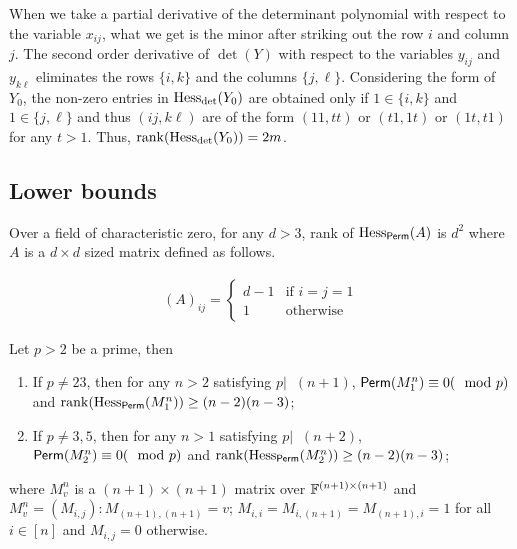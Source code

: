  When we take a  partial derivative of the determinant polynomial with respect to the variable $x_{ij}$, what we get is the minor after striking out the row $i$ and column $j$. 
 The second order derivative of $\det(Y)$ with respect to the variables $y_{ij}$ and $y_{k\ell}$ eliminates the rows $\{i,k\}$ and the columns $\{j,\ell\}$. Considering the form of $Y_0$, the non-zero entries in $\mathrm{Hess}_{\det}(Y_0)$ are obtained only if $1\in\{i,k\}$ and $1\in\{j,\ell\}$ and thus $(ij,k\ell)$ are of the form $(11,tt)$ or $(t1,1t)$ or $(1t,t1)$ for any $t>1$. Thus, $\mathrm{rank}(\mathrm{Hess}_{\det}(Y_0)) = 2m$.
 
\subsection{Lower bounds}

\begin{theorem}[\cite{mr04}]
	Over a field of characteristic zero, for any $d>3$, rank of $\mathrm{Hess}_{\mathsf{Perm}}(A)$ is $d^2$ where $A$ is a $d\times d$ sized matrix defined as follows.
	
	\begin{align*}
		(A)_{ij} = \begin{cases}
			d-1& \mbox{if $i=j=1$}\\
			1& \mbox{otherwise}
		\end{cases}
	\end{align*}
\end{theorem}

\begin{theorem}
	Let $p > 2$ be a prime, then
	\begin{enumerate}
		\item If $p \neq 23$, then for any $n > 2$ satisfying $p\lvert 􏰄􏰄(n+1)$, $\mathsf{Perm}(M^n_1) \equiv 0 (\mod p)$ and $\mathrm{rank}(\mathrm{Hess}_{\mathsf{Perm}}(M^n_1)) \geq (n-2)(n-3)$;
		\item If $p \neq 3, 5$, then for any $n > 1$ satisfying $p\lvert􏰄􏰄(n + 2)$, $\mathsf{Perm}(M^n_2) \equiv 0 (\mod p)$ and $\mathrm{rank}(\mathrm{Hess}_{\mathsf{Perm}}(M^n_2)) \geq (n-2)(n-3)$;
	\end{enumerate}
	
	where $M^n_v$ is a $(n+1)\times(n+1)$ matrix over $\mathbb{F}^{(n+1)\times(n+1)}$ and $M^n_v = (M_{i,j}) : M_{(n+1),(n+1)} = v$; $M_{i,i} = M_{i,(n+1)} = M_{(n+1),i} = 1$ for all $i\in[n]$ and $M_{i,j}=0$ otherwise.
	
\end{theorem}


